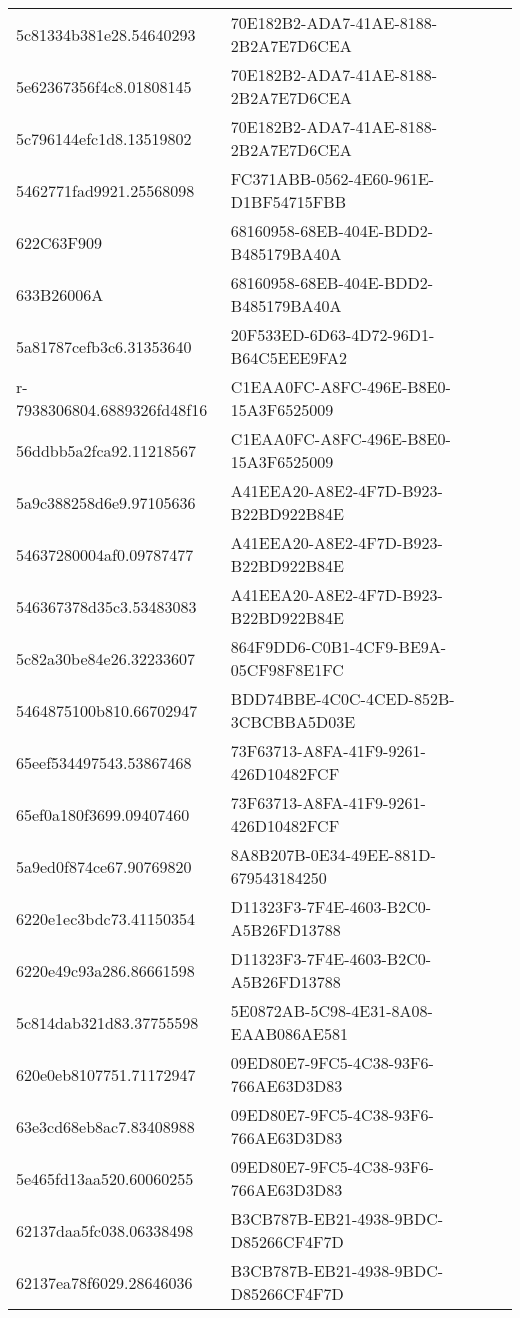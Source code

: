 \begin{tabular}{ll}
5c81334b381e28.54640293 & 70E182B2-ADA7-41AE-8188-2B2A7E7D6CEA \\
5e62367356f4c8.01808145 & 70E182B2-ADA7-41AE-8188-2B2A7E7D6CEA \\
5c796144efc1d8.13519802 & 70E182B2-ADA7-41AE-8188-2B2A7E7D6CEA \\
5462771fad9921.25568098 & FC371ABB-0562-4E60-961E-D1BF54715FBB \\
622C63F909 & 68160958-68EB-404E-BDD2-B485179BA40A \\
633B26006A & 68160958-68EB-404E-BDD2-B485179BA40A \\
5a81787cefb3c6.31353640 & 20F533ED-6D63-4D72-96D1-B64C5EEE9FA2 \\
r-7938306804.6889326fd48f16 & C1EAA0FC-A8FC-496E-B8E0-15A3F6525009 \\
56ddbb5a2fca92.11218567 & C1EAA0FC-A8FC-496E-B8E0-15A3F6525009 \\
5a9c388258d6e9.97105636 & A41EEA20-A8E2-4F7D-B923-B22BD922B84E \\
54637280004af0.09787477 & A41EEA20-A8E2-4F7D-B923-B22BD922B84E \\
546367378d35c3.53483083 & A41EEA20-A8E2-4F7D-B923-B22BD922B84E \\
5c82a30be84e26.32233607 & 864F9DD6-C0B1-4CF9-BE9A-05CF98F8E1FC \\
5464875100b810.66702947 & BDD74BBE-4C0C-4CED-852B-3CBCBBA5D03E \\
65eef534497543.53867468 & 73F63713-A8FA-41F9-9261-426D10482FCF \\
65ef0a180f3699.09407460 & 73F63713-A8FA-41F9-9261-426D10482FCF \\
5a9ed0f874ce67.90769820 & 8A8B207B-0E34-49EE-881D-679543184250 \\
6220e1ec3bdc73.41150354 & D11323F3-7F4E-4603-B2C0-A5B26FD13788 \\
6220e49c93a286.86661598 & D11323F3-7F4E-4603-B2C0-A5B26FD13788 \\
5c814dab321d83.37755598 & 5E0872AB-5C98-4E31-8A08-EAAB086AE581 \\
620e0eb8107751.71172947 & 09ED80E7-9FC5-4C38-93F6-766AE63D3D83 \\
63e3cd68eb8ac7.83408988 & 09ED80E7-9FC5-4C38-93F6-766AE63D3D83 \\
5e465fd13aa520.60060255 & 09ED80E7-9FC5-4C38-93F6-766AE63D3D83 \\
62137daa5fc038.06338498 & B3CB787B-EB21-4938-9BDC-D85266CF4F7D \\
62137ea78f6029.28646036 & B3CB787B-EB21-4938-9BDC-D85266CF4F7D \\

\end{tabular}
